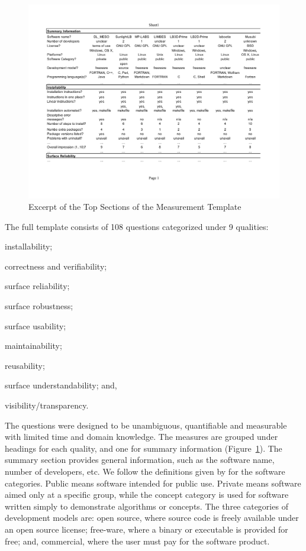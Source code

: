 \documentclass[final, 3p, times, authoryear]{elsarticle}
\begin{document}
\begin{figure}[!ht]
	\begin{center}
	  \includegraphics[width=1.0\textwidth]{./figures/measurement_template.pdf}
	  \caption{Excerpt of the Top Sections of the Measurement Template}
	  \label{measurement_template_image}
	\end{center}
\end{figure}

The full template consists of 108 questions categorized under 9 qualities:
\begin{inparaenum}[(i)]
	\item installability;
	\item correctness and verifiability;
	\item surface reliability;
	\item surface robustness;
	\item surface usability;
	\item maintainability;
	\item reusability;
	\item surface understandability; and,
	\item visibility/transparency. 
\end{inparaenum} 

The questions were designed to be unambiguous, quantifiable and measurable with
limited time and domain knowledge. The measures are grouped under headings for
each quality, and one for summary information
(Figure~\ref{measurement_template_image}). The summary section provides general
information, such as the software name, number of developers, etc.  We follow
the definitions given by \citet{gewaltig2012quality} for the software
categories.  Public means software intended for public use.  Private means
software aimed only at a specific group, while the concept category is used for
software written simply to demonstrate algorithms or concepts. The three
categories of development models are: open source, where source code is freely
available under an open source license; free-ware, where a binary or executable
is provided for free; and, commercial, where the user must pay for the software
product.  
\end{document}
